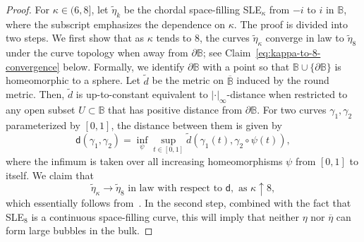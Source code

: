 \documentclass[a4paper]{article}
\numberwithin{equation}{section}
\numberwithin{equation}{section}
\renewcommand{\1}{\mathbf{1}}
\begin{document}
\begin{proof}
    For $\kappa \in (6,8]$, let $\widetilde \eta_k$ be the chordal space-filling SLE$_\kappa$ from $-i$ to $i$ in $\mathbb B$, where the subscript emphasizes the dependence on $\kappa$. The proof is divided into two steps. We first show that as $\kappa$ tends to 8, the curves $\widetilde \eta_\kappa$ converge in law to $\widetilde \eta_8$ under the curve topology when away from $\partial \mathbb B$; see Claim~\eqref{eq:kappa-to-8-convergence} below. Formally, we identify $\partial \mathbb B$ with a point so that $\mathbb B \cup \{\partial \mathbb B\}$ is homeomorphic to a sphere. Let $\widetilde d$ be the metric on $\overline{\mathbb{B}}$ induced by the round metric. Then, $\widetilde d$ is up-to-constant equivalent to $|\cdot|_\infty$-distance when restricted to any open subset $U \subset \mathbb B$ that has positive distance from $\partial \mathbb B$. For two curves $\gamma_1,\gamma_2$ parameterized by $[0,1]$, the distance between them is given by
    \[ \mathsf d(\gamma_1,\gamma_2)=\inf_\psi \sup_{t \in [0,1]} \widetilde d(\gamma_1(t),\gamma_2 \circ \psi(t)), \]
    where the infimum is taken over all increasing homeomorphisms $\psi$ from $[0,1]$ to itself. We claim that
    \begin{equation}\label{eq:kappa-to-8-convergence}
        \widetilde \eta_\kappa \to \widetilde \eta_8 \mbox{ in law with respect to } \mathsf d, \mbox{ as } \kappa \uparrow 8,
    \end{equation}
    which essentially follows from~\cite{AM-SLE8}. In the second step, combined with the fact that SLE$_8$ is a continuous space-filling curve, this will imply that neither $\eta$ nor $\overline \eta$ can form large bubbles in the bulk.
    

\end{proof}
\end{document}
